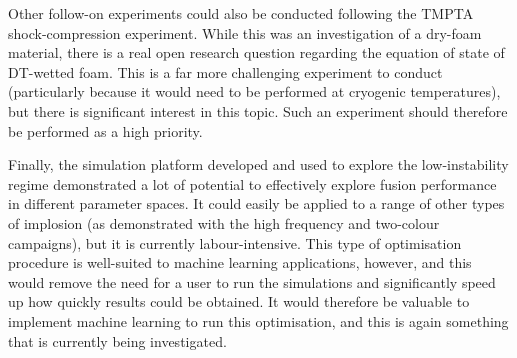 Other follow-on experiments could also be conducted following the TMPTA shock-compression experiment. While this was an investigation of a dry-foam material, there is a real open research question regarding the equation of state of DT-wetted foam. This is a far more challenging experiment to conduct (particularly because it would need to be performed at cryogenic temperatures), but there is significant interest in this topic. Such an experiment should therefore be performed as a high priority.

Finally, the simulation platform developed and used to explore the low-instability regime demonstrated a lot of potential to effectively explore fusion performance in different parameter spaces. It could easily be applied to a range of other types of implosion (as demonstrated with the high frequency and two-colour campaigns), but it is currently labour-intensive. This type of optimisation procedure is well-suited to machine learning applications, however, and this would remove the need for a user to run the simulations and significantly speed up how quickly results could be obtained. It would therefore be valuable to implement machine learning to run this optimisation, and this is again something that is currently being investigated.